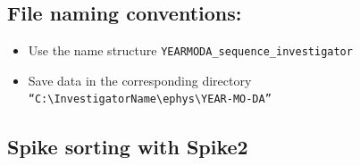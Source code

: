 \documentclass[
]{book}
\begin{document}
\hypertarget{file-naming-conventions}{%
\subsection{File naming conventions:}\label{file-naming-conventions}}

\begin{itemize}
\item
  Use the name structure \texttt{YEARMODA\_sequence\_investigator}
\item
  Save data in the corresponding directory
  \texttt{“C:\textbackslash{}InvestigatorName\textbackslash{}ephys\textbackslash{}YEAR-MO-DA”}
\end{itemize}

\hypertarget{spike-sorting-with-spike2}{%
\subsection{Spike sorting with Spike2}\label{spike-sorting-with-spike2}}
\end{document}
